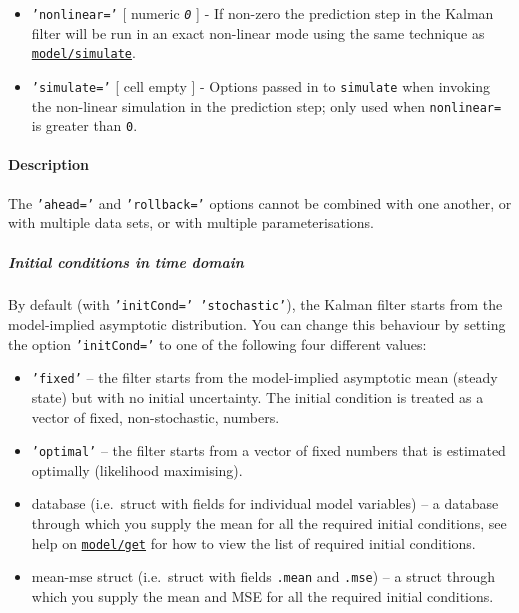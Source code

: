 \begin{itemize}
\item
  \texttt{'nonlinear='} {[} numeric \textbar{} \emph{\texttt{0}} {]} -
  If non-zero the prediction step in the Kalman filter will be run in an
  exact non-linear mode using the same technique as
  \href{model/simulate}{\texttt{model/simulate}}.
\item
  \texttt{'simulate='} {[} cell \textbar{} empty {]} - Options passed in
  to \texttt{simulate} when invoking the non-linear simulation in the
  prediction step; only used when \texttt{nonlinear=} is greater than
  \texttt{0}.
\end{itemize}

\paragraph{Description}

The \texttt{'ahead='} and \texttt{'rollback='} options cannot be
combined with one another, or with multiple data sets, or with multiple
parameterisations.

\subparagraph{Initial conditions in time
domain}

By default (with \texttt{'initCond=' 'stochastic'}), the Kalman filter
starts from the model-implied asymptotic distribution. You can change
this behaviour by setting the option \texttt{'initCond='} to one of the
following four different values:

\begin{itemize}
\item
  \texttt{'fixed'} -- the filter starts from the model-implied
  asymptotic mean (steady state) but with no initial uncertainty. The
  initial condition is treated as a vector of fixed, non-stochastic,
  numbers.
\item
  \texttt{'optimal'} -- the filter starts from a vector of fixed numbers
  that is estimated optimally (likelihood maximising).
\item
  database (i.e.~struct with fields for individual model variables) -- a
  database through which you supply the mean for all the required
  initial conditions, see help on \href{model/get}{\texttt{model/get}}
  for how to view the list of required initial conditions.
\item
  mean-mse struct (i.e.~struct with fields \texttt{.mean} and
  \texttt{.mse}) -- a struct through which you supply the mean and MSE
  for all the required initial conditions.
\end{itemize}

